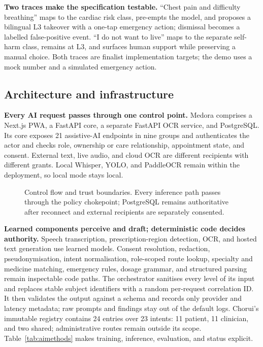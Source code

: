 \documentclass[12pt,twocolumn,a4paper]{article}
\begin{document}
\textbf{Two traces make the specification testable.} ``Chest pain and difficulty
breathing'' maps to the cardiac risk class, pre-empts the model, and proposes a bilingual
L3 takeover with a one-tap emergency action; dismissal becomes a labelled false-positive
event. ``I do not want to live'' maps to the separate self-harm class, remains at L3, and
surfaces human support while preserving a manual choice. Both traces are finalist
implementation targets; the demo uses a mock number and a simulated emergency action.

\subsection{Architecture and infrastructure}

\textbf{Every AI request passes through one control point.} Medora comprises a Next.js
PWA, a FastAPI core, a separate FastAPI OCR service, and PostgreSQL. Its core exposes 21
assistive-AI endpoints in nine groups and authenticates
the actor and checks role, ownership or care relationship, appointment state, and consent.
External text, live audio, and cloud OCR are different recipients with different grants.
Local Whisper, YOLO, and PaddleOCR remain within the deployment, so local mode stays local.

\begin{figure}[!t]
\centering
\resizebox{.80\textwidth}{!}{}
\caption{Control flow and trust boundaries. Every inference path passes through the policy
chokepoint; PostgreSQL remains authoritative after reconnect and external recipients are
separately consented.}
\label{fig:architecture}
\end{figure}

\textbf{Learned components perceive and draft; deterministic code decides authority.}
Speech transcription, prescription-region detection, OCR, and hosted text generation use
learned models. Consent resolution, redaction, pseudonymisation, intent normalisation,
role-scoped route lookup, specialty and medicine matching, emergency rules, dosage grammar,
and structured parsing remain inspectable code paths. The orchestrator sanitises every level
of its input and replaces stable subject identifiers with a random per-request correlation ID.
It then validates the output against a schema and records only provider and latency metadata;
raw prompts and findings stay out of the default logs. Chorui's immutable registry contains 24 entries over 23 intents: 11 patient,
11 clinician, and two shared; administrative routes remain outside its scope. Table~\ref{tab:aimethods}
makes training, inference, evaluation, and status explicit.
\end{document}
